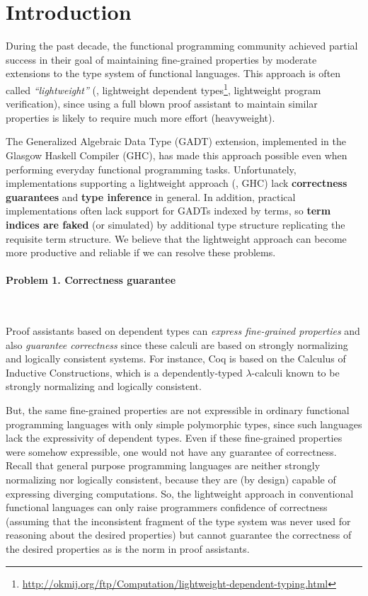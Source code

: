 \section{Introduction}
During the past decade, the functional programming community achieved
partial success in their goal of maintaining fine-grained properties
by moderate extensions to the type system of functional languages\cite{CheHin03,CheHin02,Xi03}.
This approach is often called \emph{``lightweight''}
(\eg, lightweight dependent types\footnote{
  \url{http://okmij.org/ftp/Computation/lightweight-dependent-typing.html} },
  lightweight program verification),
since using a full blown proof assistant to maintain similar properties is likely to require
much more effort (heavyweight).

The Generalized Algebraic Data Type (GADT) extension, implemented
in the Glasgow Haskell Compiler (GHC), has made this approach
possible even when performing everyday functional programming tasks.
%
Unfortunately, implementations supporting a lightweight approach (\eg, GHC)
lack \textbf{correctness guarantees} and \textbf{type inference} in general.
In addition, practical implementations often lack support for GADTs indexed
by terms, so \textbf{term indices are faked} (or simulated) by additional
type structure replicating the requisite term structure. We believe that the lightweight approach can
become more productive and reliable if we can resolve these problems.

\paragraph{Problem 1. \textbf{Correctness guarantee}} ~

Proof assistants based on dependent types can
\emph{express fine-grained properties} and
also \emph{guarantee correctness} since these calculi are based on
strongly normalizing and logically consistent systems. For instance, Coq is
based on the Calculus of Inductive Constructions, which is a dependently-typed
$\lambda$-calculi known to be strongly normalizing and logically consistent.
 
But, the same fine-grained properties are not expressible in ordinary functional
programming languages with only simple polymorphic types, since such languages lack the
expressivity of dependent types. Even if these fine-grained properties were somehow
expressible, one would not have any guarantee of correctness. Recall that general purpose
programming languages are neither strongly normalizing nor logically consistent, because
they are (by design) capable of expressing diverging computations. So, the lightweight
approach in conventional functional languages can only raise programmers confidence of
correctness (assuming that the inconsistent fragment of the type system was never used for
reasoning about the desired properties) but cannot guarantee the correctness of the desired
properties as is the norm in proof assistants.

